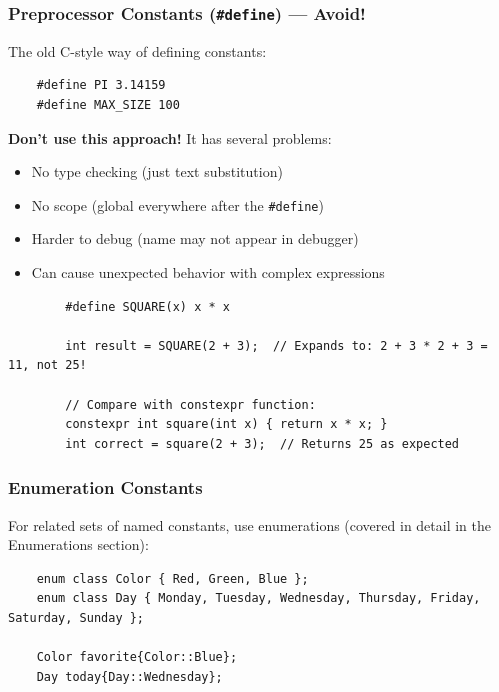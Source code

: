 \subsubsection{Preprocessor Constants (\texttt{\#define}) — Avoid!}

The old C-style way of defining constants:

\begin{lstlisting}
	#define PI 3.14159
	#define MAX_SIZE 100
\end{lstlisting}

\textbf{Don't use this approach!} It has several problems:
\begin{itemize}
	\item No type checking (just text substitution)
	\item No scope (global everywhere after the \texttt{\#define})
	\item Harder to debug (name may not appear in debugger)
	\item Can cause unexpected behavior with complex expressions
\end{itemize}

\begin{example}{\leavevmode}
	
	\begin{lstlisting}
		#define SQUARE(x) x * x
		
		int result = SQUARE(2 + 3);  // Expands to: 2 + 3 * 2 + 3 = 11, not 25!
		
		// Compare with constexpr function:
		constexpr int square(int x) { return x * x; }
		int correct = square(2 + 3);  // Returns 25 as expected
	\end{lstlisting}
\end{example}

\subsubsection{Enumeration Constants}

For related sets of named constants, use enumerations (covered in detail in the Enumerations section):

\begin{lstlisting}
	enum class Color { Red, Green, Blue };
	enum class Day { Monday, Tuesday, Wednesday, Thursday, Friday, Saturday, Sunday };
	
	Color favorite{Color::Blue};
	Day today{Day::Wednesday};
\end{lstlisting}

